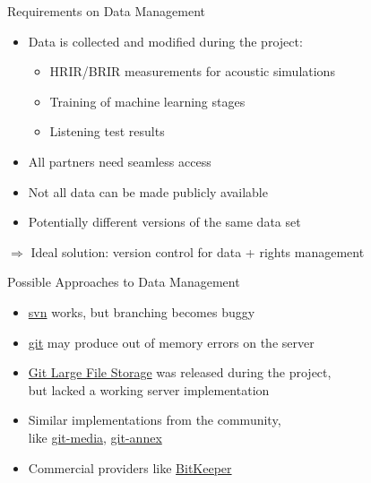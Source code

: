 \documentclass{beamer}
\begin{document}
\begin{frame}{Requirements on Data Management}

    \begin{itemize}
        \item Data is collected and modified during the project:
            \begin{itemize}
                \item HRIR/BRIR measurements for acoustic simulations
                \item Training of machine learning stages
                \item Listening test results
            \end{itemize}
        \item All partners need seamless access
        \item Not all data can be made publicly available
        \item Potentially different versions of the same data set
    \end{itemize}

    \vspace{0.5cm}

    $\Rightarrow$ Ideal solution: version control for data + rights management

\end{frame}

\begin{frame}{Possible Approaches to Data Management}

    \begin{itemize}
        \item \href{https://subversion.apache.org}{svn} works, but branching becomes buggy
        \item \href{https://git-scm.com}{git} may produce out of memory errors on the server
            \item \href{https://git-lfs.github.com}{Git Large File Storage} was released during the project, \\ but lacked a working server implementation
        \item Similar implementations from the community, \\ like
            \href{https://github.com/alebedev/git-media}{git-media},
            \href{https://git-annex.branchable.com}{git-annex}
        \item Commercial providers like
            \href{http://www.bitkeeper.com/bam.html}{BitKeeper}
    \end{itemize}

\end{frame}
\end{document}
